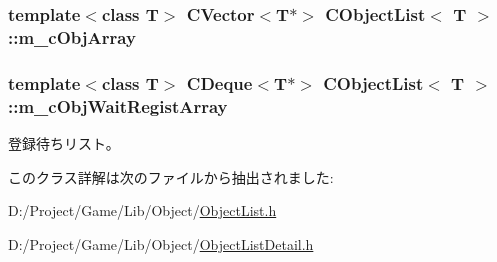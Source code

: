 \subsubsection[{m\+\_\+c\+Obj\+Array}]{\setlength{\rightskip}{0pt plus 5cm}template$<$class T$>$ {\bf C\+Vector}$<$T$\ast$$>$ {\bf C\+Object\+List}$<$ T $>$\+::m\+\_\+c\+Obj\+Array\hspace{0.3cm}{\ttfamily [protected]}}\label{class_c_object_list_a38b7ceb7e93f096b55c708a76afaf389}
\hypertarget{class_c_object_list_af1fd49458d78701c70b0e34aa5a3b4e7}{}
\subsubsection[{m\+\_\+c\+Obj\+Wait\+Regist\+Array}]{\setlength{\rightskip}{0pt plus 5cm}template$<$class T$>$ {\bf C\+Deque}$<$T$\ast$$>$ {\bf C\+Object\+List}$<$ T $>$\+::m\+\_\+c\+Obj\+Wait\+Regist\+Array\hspace{0.3cm}{\ttfamily [protected]}}\label{class_c_object_list_af1fd49458d78701c70b0e34aa5a3b4e7}


登録待ちリスト。 



このクラス詳解は次のファイルから抽出されました\+:\begin{DoxyCompactItemize}
\item 
D\+:/\+Project/\+Game/\+Lib/\+Object/\hyperlink{_object_list_8h}{Object\+List.\+h}\item 
D\+:/\+Project/\+Game/\+Lib/\+Object/\hyperlink{_object_list_detail_8h}{Object\+List\+Detail.\+h}\end{DoxyCompactItemize}
